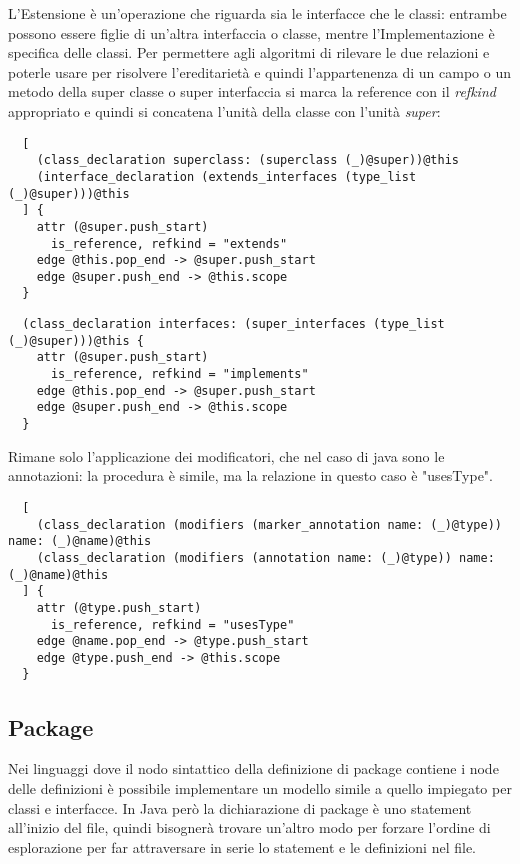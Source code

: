 L'Estensione \`e un'operazione che riguarda sia le interfacce che le classi: entrambe possono essere figlie di un'altra interfaccia o classe, mentre l'Implementazione \`e specifica delle classi.
Per permettere agli algoritmi di rilevare le due relazioni e poterle usare per risolvere l'ereditariet\`a e quindi l'appartenenza di un campo o un metodo della super classe o super interfaccia si marca la reference con il \emph{refkind} appropriato e quindi si concatena l'unit\`a della classe con l'unit\`a \emph{super}:

\begin{lstlisting}
  [
    (class_declaration superclass: (superclass (_)@super))@this
    (interface_declaration (extends_interfaces (type_list (_)@super)))@this
  ] {
    attr (@super.push_start)
      is_reference, refkind = "extends"
    edge @this.pop_end -> @super.push_start
    edge @super.push_end -> @this.scope
  }
\end{lstlisting}

\begin{lstlisting}
  (class_declaration interfaces: (super_interfaces (type_list (_)@super)))@this {
    attr (@super.push_start)
      is_reference, refkind = "implements"
    edge @this.pop_end -> @super.push_start
    edge @super.push_end -> @this.scope
  }
\end{lstlisting}

Rimane solo l'applicazione dei modificatori, che nel caso di java sono le annotazioni: la procedura \`e simile, ma la relazione in questo caso \`e "usesType".

\begin{lstlisting}
  [
    (class_declaration (modifiers (marker_annotation name: (_)@type)) name: (_)@name)@this
    (class_declaration (modifiers (annotation name: (_)@type)) name: (_)@name)@this
  ] {
    attr (@type.push_start)
      is_reference, refkind = "usesType"
    edge @name.pop_end -> @type.push_start
    edge @type.push_end -> @this.scope
  }
\end{lstlisting}

\subsection{Package}

Nei linguaggi dove il nodo sintattico della definizione di package contiene i node delle definizioni \`e possibile implementare un modello simile a quello impiegato per classi e interfacce.
In Java per\`o la dichiarazione di package \`e uno statement all'inizio del file, quindi bisogner\`a trovare un'altro modo per forzare l'ordine di esplorazione per far attraversare in serie lo statement e le definizioni nel file.

